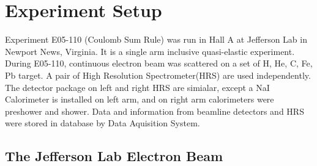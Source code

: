 


\chapter{Experiment Setup}
\label{C3}

Experiment E05-110 (Coulomb Sum Rule) was run in Hall A at Jefferson Lab in Newport News, Virginia. It is a single arm inclusive quasi-elastic experiment. During E05-110, continuous electron beam was scattered on a set of H, He, C, Fe, Pb target. A pair of High Resolution Spectrometer(HRS) are used independently. The detector package on left and right HRS are simialar, except a NaI Calorimeter is installed on left arm, and on right arm calorimeters were preshower and shower. Data and information from beamline detectors and HRS were stored in database by Data Aquisition System.

\section{The Jefferson Lab Electron Beam}
\label{C3S1}




\cite{*}

